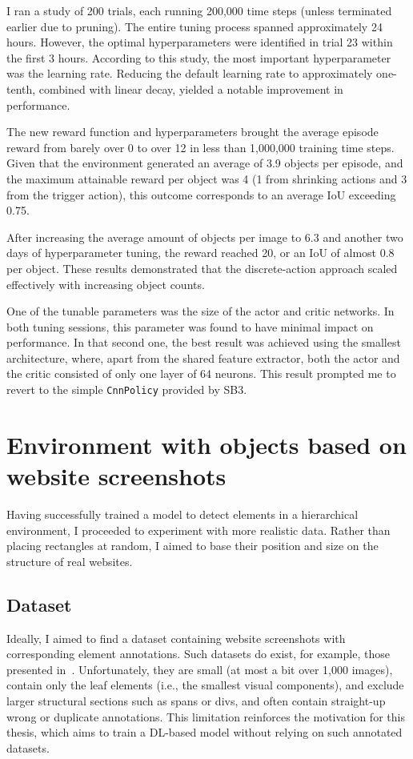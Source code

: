 \documentclass[
  digital,     %
  oneside,     %
  nosansbold,  %
  nocolorbold, %
  lof,         %
  lot,         %
]{fithesis4}
\begin{document}
I ran a study of 200 trials, each running 200,000 time steps (unless terminated earlier due to pruning). The entire tuning process spanned approximately 24 hours. However, the optimal hyperparameters were identified in trial 23 within the first 3 hours. According to this study, the most important hyperparameter was the learning rate. Reducing the default learning rate to approximately one-tenth, combined with linear decay, yielded a notable improvement in performance.

The new reward function and hyperparameters brought the average episode reward from barely over 0 to over 12 in less than 1,000,000 training time steps. Given that the environment generated an average of 3.9 objects per episode, and the maximum attainable reward per object was 4 (1 from shrinking actions and 3 from the trigger action), this outcome corresponds to an average IoU exceeding 0.75.

After increasing the average amount of objects per image to 6.3 and another two days of hyperparameter tuning, the reward reached 20, or an IoU of almost 0.8 per object. These results demonstrated that the discrete-action approach scaled effectively with increasing object counts.

One of the tunable parameters was the size of the actor and critic networks. In both tuning sessions, this parameter was found to have minimal impact on performance. In that second one, the best result was achieved using the smallest architecture, where, apart from the shared feature extractor, both the actor and the critic consisted of only one layer of 64 neurons. This result prompted me to revert to the simple \texttt{CnnPolicy} provided by SB3.

\section{Environment with objects based on website screenshots}

Having successfully trained a model to detect elements in a hierarchical environment, I proceeded to experiment with more realistic data. Rather than placing rectangles at random, I aimed to base their position and size on the structure of real websites.

\subsection{Dataset}
\label{subsec:dataset}

Ideally, I aimed to find a dataset containing website screenshots with corresponding element annotations. Such datasets do exist, for example, those presented in~\cite{roboflow-dataset-1, roboflow-dataset-2}. Unfortunately, they are small (at most a bit over 1,000 images), contain only the leaf elements (i.e., the smallest visual components), and exclude larger structural sections such as spans or divs, and often contain straight-up wrong or duplicate annotations. This limitation reinforces the motivation for this thesis, which aims to train a DL-based model without relying on such annotated datasets.
\end{document}
